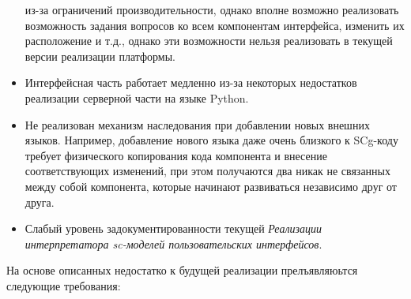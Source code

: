 \begin{itemize}
    из-за ограничений производительности, однако вполне возможно реализовать возможность задания вопросов ко всем
    компонентам интерфейса, изменить их расположение и т.д., однако эти возможности нельзя реализовать в текущей
    версии реализации платформы.
    \item Интерфейсная часть работает медленно из-за некоторых недостатков реализации серверной части на языке Python.
    \item Не реализован механизм наследования при добавлении новых внешних языков. Например, добавление нового языка
    даже очень близкого к SCg-коду требует физического копирования кода компонента и внесение соответствующих изменений,
    при этом получаются два никак не связанных между собой компонента, которые начинают развиваться независимо друг от
    друга.
    \item Слабый уровень задокументированности текущей \textit{Реализации интерпретатора sc-моделей пользовательских
    интерфейсов}.
\end{itemize}

На основе описанных недостатко к будущей реализации прелъявляюьтся следующие требования:

